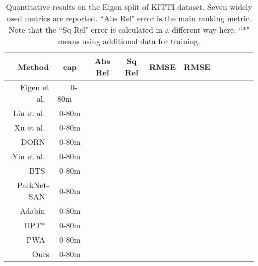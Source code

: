 \documentclass[10pt,twocolumn,letterpaper]{article}
\begin{document}
\setlength{\tabcolsep}{3pt}
\begin{table*}[]
\small
\centering
\begin{tabular}{r c c c c c c c c c c}
\toprule
Method & cap & Abs Rel  & Sq Rel  & RMSE  & RMSE  &   &   &    \\
\midrule
Eigen et al.~\cite{eigen2014depth} & \ \  0-80m \ \  &  &  &  &  &  &  & \\
Liu et al.~\cite{liu2015deep} & 0-80m &  &  &  &  &  &  & \\
Xu et al.~\cite{xu2018structured} & 0-80m &  &  &  &  &  &  & \\
DORN~\cite{fu2018deep} & 0-80m &  &  &  &  &  &  & \\
Yin et al.~\cite{yin2019enforcing} & 0-80m &  &  &  &  &  &  & \\
BTS~\cite{lee2019big} & 0-80m &  &  &  &  &  &  & \\
PackNet-SAN~\cite{guizilini2021sparse} & 0-80m &  &  &  &  &  &  & \\
Adabin~\cite{bhat2021adabins} & 0-80m &  &  &  &  &  &  & \\
DPT*~\cite{ranftl2021vision} & 0-80m &  &  &  &  &  &  & \\
PWA~\cite{lee2021patch} & 0-80m &  &  &  &  &  &  & \\
Ours & 0-80m &  &  &  &  &  &  & \\


\bottomrule
\end{tabular}
\vspace{-2mm}
\caption{Quantitative results on the Eigen split of KITTI dataset. Seven widely used metrics are reported. ``Abs Rel" error is the main ranking metric. Note that the ``Sq Rel" error is calculated in a different way here. ``*" means using additional data for training.}
\label{tab:kitti_eigen}
\vspace{-2mm}
\end{table*}
\setlength{\tabcolsep}{3pt}
\end{document}
